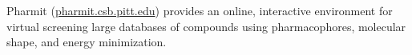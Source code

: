 Pharmit (\url{pharmit.csb.pitt.edu}) provides an online, interactive environment for virtual screening large databases of compounds using pharmacophores, molecular shape, and energy minimization.
